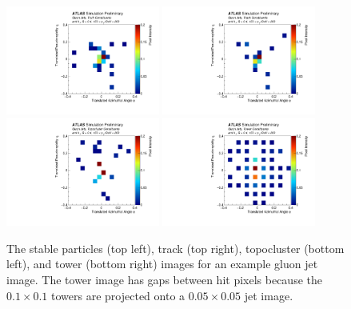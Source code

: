 \begin{figure}[h!]
\begin{center}
\includegraphics[width=0.45\textwidth]{figures/CNN/gluon_truth_one.pdf}
\includegraphics[width=0.45\textwidth]{figures/CNN/gluon_track_one.pdf}\\
\includegraphics[width=0.45\textwidth]{figures/CNN/gluon_cluster_one.pdf}
\includegraphics[width=0.45\textwidth]{figures/CNN/gluon_tower_one.pdf}
\caption{The stable particles (top left), track (top right), topocluster (bottom left), and tower (bottom right) images 
for an example gluon jet image.  
The tower image has gaps between hit pixels because the $0.1\times 0.1$ towers are projected onto a $0.05\times 0.05$ jet image.}
\label{fig:cnn-oneimage}
\end{center}
\end{figure}

